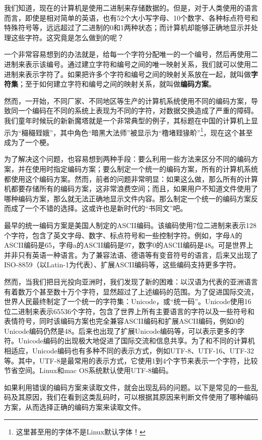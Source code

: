 \documentclass[../main.tex]{subfiles}
\begin{document}
我们知道，现在的计算机是使用二进制来存储数据的。但是，对于人类使用的语言而言，即使是相对简单的英语，也有52个大小写字母、10个数字、各种标点符号和特殊符号等，远远超过了二进制的0和1两种状态；而计算机却能够正确地显示并处理这些字符。这究竟是怎么做到的呢？

一个非常容易想到的办法就是，给每一个字符分配唯一的一个编号，然后再使用二进制来表示该编号。通过建立字符和编号之间的唯一映射关系，我们就可以使用二进制来表示字符了。如果把许多个字符和编号之间的映射关系放在一起，就叫做\textbf{字符集}；至于如何建立字符和编号之间的映射关系，就叫做\textbf{编码方案}。

然而，一开始，不同厂家、不同地区等生产的计算机系统使用不同的编码方案，导致同一个编码在不同的系统上表现为不同的字符，对数据交换造成了严重的障碍。我们童年时候玩的新新魔塔就是一个非常典型的例子，其标题在中国的计算机上显示为“{\rare 穝穝臸娥}”，其中角色“暗黑大法师”被显示为“{\rare 穞堵臸猭畍}”\footnote{这里甚至用的字体不是Linux默认字体！}，现在这个甚至成为了一个梗。

为了解决这个问题，也容易想到两种手段：要么利用一些方法来区分不同的编码方案，并在使用时指定编码方案；要么制定一个统一的编码方案，所有的计算机系统都使用这个编码方案。然而，前者的问题非常明显：如果这么做，那么所有的计算机都要存储所有的编码方案，这非常浪费空间；而且，如果用户不知道文件使用了哪种编码方案，那么就无法正确地显示文件内容。那么制定一个统一的编码方案反而成了一个不错的选择。这或许也是新时代的“书同文”吧。

最早的统一编码方案是美国人制定的ASCII编码。该编码使用7位二进制来表示128个字符，包含了英文字母、数字、标点符号和一些控制字符。例如，字母A的ASCII编码是65，字母a的ASCII编码是97，数字0的ASCII编码是48。可是世界上并非只有英语一种语言。为了兼容法语、德语等有变音符号的语言，后来又出现了ISO-8859（以Latin-1为代表）、扩展ASCII编码等，这些编码支持更多字符。

然而，当我们把目光投向亚洲时，我们发现了新的困难：以汉语为代表的亚洲语言有着数万个甚至数十万个字符，显然超过了上述编码的范围。为了促进国际交流，世界人民最终制定了一个统一的字符集：Unicode，或“统一码”。Unicode使用16位二进制来表示65536个字符，包含了世界上所有主要语言的字符以及一些符号和表情符号，同时该编码方案也完全兼容ASCII编码和扩展ASCII编码，例如0的Unicode编码仍然是48。后来也出现了扩展Unicode编码等，可以表示更多的字符。Unicode编码的出现极大地促进了国际交流和信息共享。为了和不同的计算机相适应，Unicode编码也有多种不同的表示方式，例如UTF-8、UTF-16、UTF-32等。其中，UTF-8是最常用的表示方式，它使用1到4个字节来表示一个字符，比较节省空间。Linux和mac OS系统默认使用UTF-8编码。

如果利用错误的编码方案来读取文件，就会出现乱码的问题。以下是常见的一些乱码及其原因，我们在看到这类乱码时，可以根据其原因来判断文件使用了哪种编码方案，从而选择正确的编码方案来读取文件。
\end{document}
